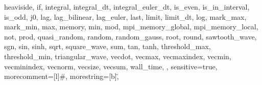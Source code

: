 {{      heaviside,
      if,
      integral,
      integral_dt,
      integral_euler_dt,
      is_even,
      is_in_interval,
      is_odd,
      j0,
      lag,
      lag_bilinear,
      lag_euler,
      last,
      limit,
      limit_dt,
      log,
      mark_max,
      mark_min,
      max,
      memory,
      min,
      mod,
      mpi_memory_global,
      mpi_memory_local,
      not,
      prod,
      quasi_random,
      random,
      random_gauss,
      root,
      round,
      sawtooth_wave,
      sgn,
      sin,
      sinh,
      sqrt,
      square_wave,
      sum,
      tan,
      tanh,
      threshold_max,
      threshold_min,
      triangular_wave,
      vecdot,
      vecmax,
      vecmaxindex,
      vecmin,
      vecminindex,
      vecnorm,
      vecsize,
      vecsum,
      wall_time,
},
sensitive=true,
morecomment=[l]{\#},
morestring=[b]\",
}
